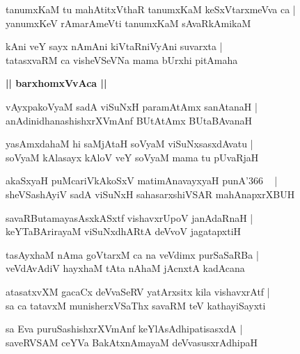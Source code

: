 \documentclass[twoside,12pt,openright]{book}
\newcounter{shloka}[chapter]
\def\uvaca#1{\centerline{{\large\textbf{#1}}}}
\begin{document}
\begin{shloka}%
tanumxKaM tu mahAtitxVthaR tanumxKaM keSxVtarxmeVva ca |\\
yanumxKeV rAmarAmeVti tanumxKaM sAvaRkAmikaM 
\end{shloka}

\begin{shloka}%
kAni veY sayx nAmAni kiVtaRniVyAni suvarxta |\\
tatasxvaRM ca visheVSeVNa mama bUrxhi pitAmaha 
\end{shloka}

\uvaca{|| barxhomxVvAca ||}

\begin{shloka}%
vAyxpakoVyaM sadA viSuNxH paramAtAmx sanAtanaH |\\
anAdinidhanashishxrXVmAnf BUtAtAmx BUtaBAvanaH 
\end{shloka}

\begin{shloka}%
yasAmxdahaM hi saMjAtaH soVyaM viSuNxsasxdAvatu |\\
soVyaM kAlasayx kAloV veY soVyaM mama tu pUvaRjaH
\end{shloka}

\begin{shloka}%
akaSxyaH puMcariVkAkoSxV matimAnavayxyaH punA\char'366  ~ |\\
sheVSashAyiV sadA viSuNxH sahasarxshiVSAR mahAnapxrXBUH
\end{shloka}

\begin{shloka}%
savaRButamayasAsxkASxtf vishavxrUpoV janAdaRnaH |\\
keYTaBArirayaM viSuNxdhARtA deVvoV jagatapxtiH 
\end{shloka}

\begin{shloka}%
tasAyxhaM nAma goVtarxM ca na veVdimx purSaSaRBa |\\
veVdAvAdiV hayxhaM tAta nAhaM jAcnxtA kadAcana
\end{shloka}

\begin{shloka}%
atasatxvXM gacaCx deVvaSeRV yatArxsitx kila vishavxrAtf |\\
sa ca tatavxM munisherxVSaThx savaRM teV kathayiSayxti
\end{shloka}

\begin{shloka}%
sa Eva puruSashishxrXVmAnf keYlAsAdhipatisasxdA |\\
saveRVSAM ceYVa BakAtxnAmayaM deVvasusxrAdhipaH 
\end{shloka}
\end{document}
